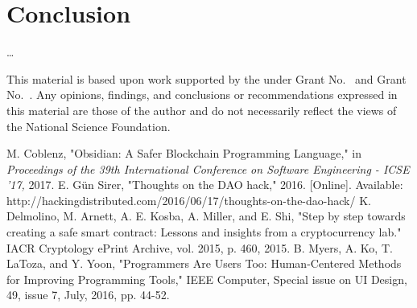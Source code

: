 \documentclass[sigplan,10pt,review,anonymous]{acmart}\settopmatter{printfolios=true}
\begin{document}
\section{Conclusion}
\ldots

\begin{acks}                            %
  This material is based upon work supported by the
   under Grant
  No.~ and Grant
  No.~.  Any opinions, findings, and
  conclusions or recommendations expressed in this material are those
  of the author and do not necessarily reflect the views of the
  National Science Foundation.
\end{acks}


\begin{thebibliography}{9}
	M. Coblenz, "Obsidian: A Safer Blockchain Programming Language," 
	in \emph{Proceedings of the 39th International Conference on Software Engineering -
	ICSE '17,} 2017.
	E. G{\"u}n Sirer, "Thoughts on the DAO hack," 2016. [Online]. 
	Available: http://hackingdistributed.com/2016/06/17/thoughts-on-the-dao-hack/
	K. Delmolino, M. Arnett, A. E. Kosba, A. Miller, and E. Shi, 
	"Step by step towards creating a safe smart contract: Lessons and insights from a cryptocurrency lab."
	IACR Cryptology ePrint Archive, vol. 2015, p. 460, 2015.
	B. Myers, A. Ko, T. LaToza, and Y. Yoon, 
	"Programmers Are Users Too: Human-Centered Methods for Improving Programming Tools," 
	IEEE Computer, Special issue on UI Design, 49, issue 7, July, 2016, pp. 44-52.
\end{thebibliography}
	
\end{document}
